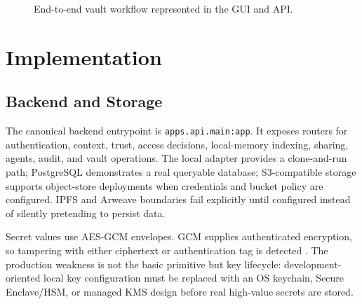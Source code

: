 \documentclass[10pt]{article}
\let\cite\citep
\begin{document}
\begin{figure}[ht]
\centering
{}
\caption{End-to-end vault workflow represented in the GUI and API.}
\label{fig:vaultflow}
\end{figure}

\section*{Implementation}

\subsection*{Backend and Storage}

The canonical backend entrypoint is \texttt{apps.api.main:app}. It exposes routers for authentication, context, trust, access decisions, local-memory indexing, sharing, agents, audit, and vault operations. The local adapter provides a clone-and-run path; PostgreSQL demonstrates a real queryable database; S3-compatible storage supports object-store deployments when credentials and bucket policy are configured. IPFS and Arweave boundaries fail explicitly until configured instead of silently pretending to persist data.

Secret values use AES-GCM envelopes. GCM supplies authenticated encryption, so tampering with either ciphertext or authentication tag is detected \cite{aesgcm}. The production weakness is not the basic primitive but key lifecycle: development-oriented local key configuration must be replaced with an OS keychain, Secure Enclave/HSM, or managed KMS design before real high-value secrets are stored.
\end{document}
